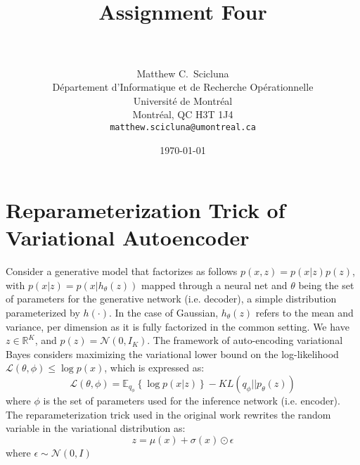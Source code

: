\documentclass[paper=a4, fontsize=11pt]{scrartcl} %
\title{	
\normalfont \normalsize 
\horrule{0.5pt} \\[0.4cm] %
\huge Assignment Four \\ %
\horrule{2pt} \\[0.5cm] %
}
\author{
	Matthew C.~Scicluna\\
	D\'epartement d'Informatique et de Recherche Op\'erationnelle\\
	Universit\'e de Montr\'eal\\
	Montr\'eal, QC H3T 1J4 \\
	\texttt{matthew.scicluna@umontreal.ca}
}
\date{\normalsize\today} %
\numberwithin{equation}{section} %
\numberwithin{figure}{section} %
\numberwithin{table}{section} %
\newcommand{\Ex}[2]{\mathbb{E}_{#1}\left\{#2\right\}}
\newcommand{\Ll}[1]{\mathcal{L}\left(#1\right)}
\newcommand{\KL}[2]{KL\left(#1 || #2\right)}
\begin{document}
\maketitle %


\section{Reparameterization Trick of Variational Autoencoder}

Consider a generative model that factorizes as follows $p(x, z) = p(x | z)p(z)$, with $p(x | z) = p(x| h_{\theta}(z))$ mapped through a neural net and $\theta$
being the set of parameters for the generative network (i.e. decoder), a simple distribution parameterized by $h(\cdot)$. In the case of Gaussian, $h_{\theta}(z)$ refers to the mean and variance, per dimension as it is fully factorized in the common setting. We have $z\in\mathbb{R}^K$, and $p(z) = \mathcal{N}(0, I_K)$. The framework of auto-encoding variational Bayes considers maximizing the variational lower bound on the log-likelihood $\Ll{\theta, \phi} \le \log p(x)$, which is expressed as:
$$ \Ll{\theta, \phi} =  \Ex{q_{\phi}}{\log p(x|z)} - \KL{q_{\phi}}{p_{\theta}(z)}$$
where $\phi$ is the set of parameters used for the inference network (i.e. encoder). The reparameterization trick used in the original work rewrites the random variable in the variational distribution as:
$$ z = \mu(x) + \sigma(x)\odot\epsilon $$
where $\epsilon\sim\mathcal{N}(0,I)$
\end{document}
